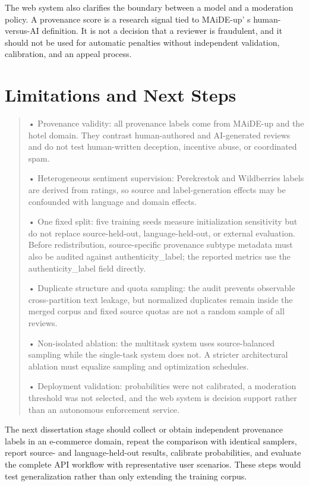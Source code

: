 \documentclass[11pt,a4paper]{article}
\begin{document}
The web system also clarifies the boundary between a model and a
moderation policy. A provenance score is a research signal tied to
MAiDE-up' s human-versus-AI definition. It is not a
decision that a reviewer is fraudulent, and it should not be used for
automatic penalties without independent validation, calibration, and an
appeal process.

\section{Limitations and Next Steps}

\begin{quote}
• Provenance validity: all provenance labels come from MAiDE-up and the
hotel domain. They contrast human-authored and AI-generated reviews and
do not test human-written deception, incentive abuse, or coordinated
spam.

• Heterogeneous sentiment supervision: Perekrestok and Wildberries
labels are derived from ratings, so source and label-generation effects
may be confounded with language and domain effects.

• One fixed split: five training seeds measure initialization
sensitivity but do not replace source-held-out, language-held-out, or
external evaluation. Before redistribution, source-specific provenance
subtype metadata must also be audited against authenticity\_label; the
reported metrics use the authenticity\_label field directly.

• Duplicate structure and quota sampling: the audit prevents observable
cross-partition text leakage, but normalized duplicates remain inside
the merged corpus and fixed source quotas are not a random sample of all
reviews.

• Non-isolated ablation: the multitask system uses source-balanced
sampling while the single-task system does not. A stricter architectural
ablation must equalize sampling and optimization schedules.

• Deployment validation: probabilities were not calibrated, a moderation
threshold was not selected, and the web system is decision support
rather than an autonomous enforcement service.
\end{quote}

The next dissertation stage should collect or obtain independent
provenance labels in an e-commerce domain, repeat the comparison with
identical samplers, report source- and language-held-out results,
calibrate probabilities, and evaluate the complete API workflow with
representative user scenarios. These steps would test generalization
rather than only extending the training corpus.
\end{document}
